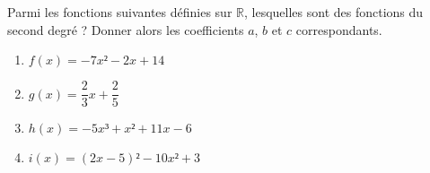 \documentclass{beamer}
\begin{document}
\begin{frame}
	Parmi les fonctions suivantes définies sur $ℝ$, lesquelles sont des fonctions du second degré ? Donner alors les coefficients $a$, $b$ et $c$ correspondants.
	\begin{enumerate}
		\item $f(x) = -7x² -2x + 14$
		\item $g(x) = \dfrac{2}{3}x + \dfrac{2}{5}$
		\item $h(x) = -5x³ + x² + 11x - 6$
		\item $i(x) = (2x - 5)² - 10x² + 3$
	\end{enumerate}
\end{frame}
\end{document}
